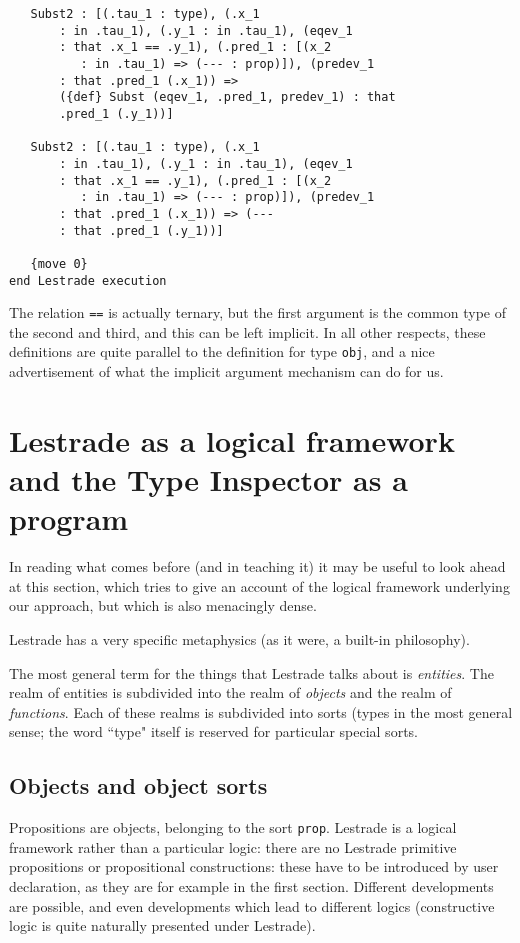 \documentclass[12pt]{article}
\begin{document}
\begin{verbatim}
   Subst2 : [(.tau_1 : type), (.x_1 
       : in .tau_1), (.y_1 : in .tau_1), (eqev_1 
       : that .x_1 == .y_1), (.pred_1 : [(x_2 
          : in .tau_1) => (--- : prop)]), (predev_1 
       : that .pred_1 (.x_1)) => 
       ({def} Subst (eqev_1, .pred_1, predev_1) : that 
       .pred_1 (.y_1))]

   Subst2 : [(.tau_1 : type), (.x_1 
       : in .tau_1), (.y_1 : in .tau_1), (eqev_1 
       : that .x_1 == .y_1), (.pred_1 : [(x_2 
          : in .tau_1) => (--- : prop)]), (predev_1 
       : that .pred_1 (.x_1)) => (--- 
       : that .pred_1 (.y_1))]

   {move 0}
end Lestrade execution

\end{verbatim}

The relation {\tt ==} is actually ternary, but the first argument is the common type of the second and third, and this can be left implicit.  In all other respects, these
definitions are quite parallel to the definition for type {\tt obj}, and a nice advertisement of what the implicit argument mechanism can do for us.



\newpage

\section{Lestrade as a logical framework and the Type Inspector as a program}

In reading what comes before (and in teaching it) it may be useful to look ahead at this section, which tries to give an account of the logical framework underlying our approach, but which is also menacingly dense.

Lestrade has a very specific metaphysics (as it were, a built-in philosophy).

The most general term for the things that Lestrade talks about is {\em entities\/}.  The realm of entities is subdivided into the realm of {\em objects\/} and the realm of {\em functions\/}.  Each of these realms is subdivided into sorts (types in the most general sense;  the word ``type" itself is reserved for particular special sorts.

\subsection{Objects and object sorts}

Propositions are objects, belonging to the sort {\tt prop}.  Lestrade is a logical framework rather than a particular logic:  there are no Lestrade primitive propositions or propositional constructions:  these have to be introduced by user declaration, as they are for example in the first section.  Different developments are possible, and even developments which lead to different logics (constructive logic is quite naturally presented under Lestrade).
\end{document}
